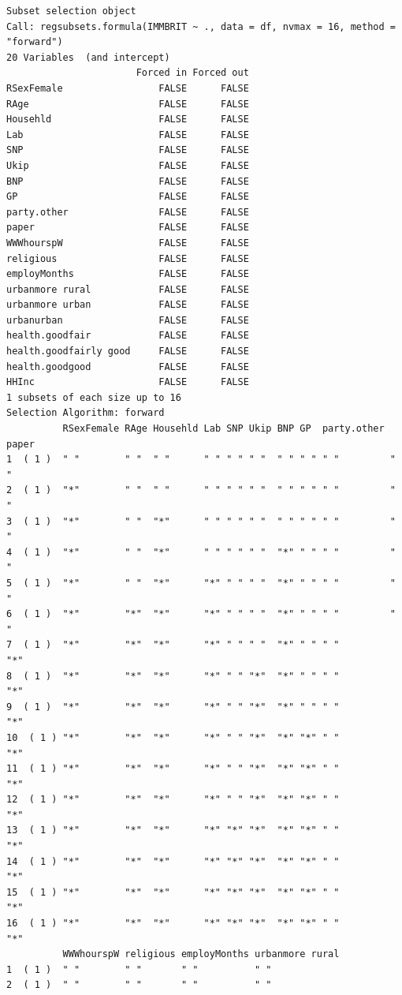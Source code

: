 \documentclass[]{article}
\begin{document}
\begin{verbatim}
Subset selection object
Call: regsubsets.formula(IMMBRIT ~ ., data = df, nvmax = 16, method = "forward")
20 Variables  (and intercept)
                       Forced in Forced out
RSexFemale                 FALSE      FALSE
RAge                       FALSE      FALSE
Househld                   FALSE      FALSE
Lab                        FALSE      FALSE
SNP                        FALSE      FALSE
Ukip                       FALSE      FALSE
BNP                        FALSE      FALSE
GP                         FALSE      FALSE
party.other                FALSE      FALSE
paper                      FALSE      FALSE
WWWhourspW                 FALSE      FALSE
religious                  FALSE      FALSE
employMonths               FALSE      FALSE
urbanmore rural            FALSE      FALSE
urbanmore urban            FALSE      FALSE
urbanurban                 FALSE      FALSE
health.goodfair            FALSE      FALSE
health.goodfairly good     FALSE      FALSE
health.goodgood            FALSE      FALSE
HHInc                      FALSE      FALSE
1 subsets of each size up to 16
Selection Algorithm: forward
          RSexFemale RAge Househld Lab SNP Ukip BNP GP  party.other paper
1  ( 1 )  " "        " "  " "      " " " " " "  " " " " " "         " "  
2  ( 1 )  "*"        " "  " "      " " " " " "  " " " " " "         " "  
3  ( 1 )  "*"        " "  "*"      " " " " " "  " " " " " "         " "  
4  ( 1 )  "*"        " "  "*"      " " " " " "  "*" " " " "         " "  
5  ( 1 )  "*"        " "  "*"      "*" " " " "  "*" " " " "         " "  
6  ( 1 )  "*"        "*"  "*"      "*" " " " "  "*" " " " "         " "  
7  ( 1 )  "*"        "*"  "*"      "*" " " " "  "*" " " " "         "*"  
8  ( 1 )  "*"        "*"  "*"      "*" " " "*"  "*" " " " "         "*"  
9  ( 1 )  "*"        "*"  "*"      "*" " " "*"  "*" " " " "         "*"  
10  ( 1 ) "*"        "*"  "*"      "*" " " "*"  "*" "*" " "         "*"  
11  ( 1 ) "*"        "*"  "*"      "*" " " "*"  "*" "*" " "         "*"  
12  ( 1 ) "*"        "*"  "*"      "*" " " "*"  "*" "*" " "         "*"  
13  ( 1 ) "*"        "*"  "*"      "*" "*" "*"  "*" "*" " "         "*"  
14  ( 1 ) "*"        "*"  "*"      "*" "*" "*"  "*" "*" " "         "*"  
15  ( 1 ) "*"        "*"  "*"      "*" "*" "*"  "*" "*" " "         "*"  
16  ( 1 ) "*"        "*"  "*"      "*" "*" "*"  "*" "*" " "         "*"  
          WWWhourspW religious employMonths urbanmore rural
1  ( 1 )  " "        " "       " "          " "            
2  ( 1 )  " "        " "       " "          " "            

\end{verbatim}
\end{document}
